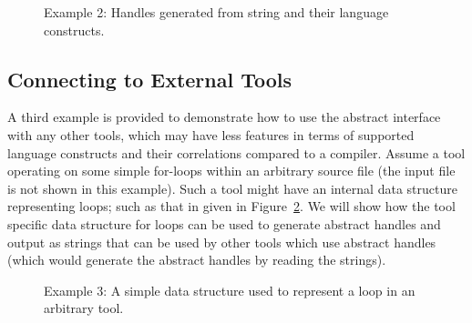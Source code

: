 \begin{figure}[!h]
{\indent
{\mySmallestFontSize
\begin{latexonly}
  
\end{latexonly}

\begin{htmlonly}
   
\end{htmlonly}

}
}
\caption{Example 2: Handles generated from string and their language constructs.}
\label{Tutorial:abstractHandle2out}
\end{figure}

\subsection{Connecting to External Tools}
   A third example is provided to demonstrate how to use the abstract interface
with any other tools, which may have less features in terms of supported language
constructs and their correlations compared to a compiler. 
Assume a tool operating on some simple for-loops within an arbitrary source file (the
input file is not shown in this example). Such a tool might
have an internal data structure representing loops; such as that in given in 
Figure~\ref{Tutorial:myloop}.  We will show how the tool specific data structure
for loops can be used to generate abstract handles and output as strings that can
be used by other tools which use abstract handles (which would generate the
abstract handles by reading the strings).
\begin{figure}[!h]
{\indent
{\mySmallestFontSize
\begin{latexonly}
  
\end{latexonly}

\begin{htmlonly}
   
\end{htmlonly}

}
}
\caption{Example 3: A simple data structure used to represent a loop in an arbitrary tool.}
\label{Tutorial:myloop}
\end{figure}

